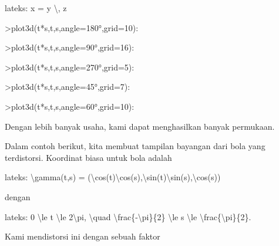 \documentclass[a4paper,10pt]{article}
\begin{document}
\begin{eulernotebook}
\begin{eulercomment}
\begin{eulercomment}
\begin{eulercomment}
lateks: x = y \textbackslash{}, z
\end{eulercomment}
\begin{eulerprompt}
>plot3d(t*s,t,s,angle=180°,grid=10):
\end{eulerprompt}
\begin{eulerprompt}
>plot3d(t*s,t,s,angle=90°,grid=16):
\end{eulerprompt}
\begin{eulerprompt}
>plot3d(t*s,t,s,angle=270°,grid=5):
\end{eulerprompt}
\begin{eulerprompt}
>plot3d(t*s,t,s,angle=45°,grid=7):
\end{eulerprompt}
\begin{eulerprompt}
>plot3d(t*s,t,s,angle=60°,grid=10):
\end{eulerprompt}
\begin{eulercomment}
Dengan lebih banyak usaha, kami dapat menghasilkan banyak permukaan.

Dalam contoh berikut, kita membuat tampilan bayangan dari bola yang
terdistorsi. Koordinat biasa untuk bola adalah

lateks: \textbackslash{}gamma(t,s) = (\textbackslash{}cos(t)\textbackslash{}cos(s),\textbackslash{}sin(t)\textbackslash{}sin(s),\textbackslash{}cos(s))

dengan

lateks: 0 \textbackslash{}le t \textbackslash{}le 2\textbackslash{}pi, \textbackslash{}quad \textbackslash{}frac\{-\textbackslash{}pi\}\{2\} \textbackslash{}le s \textbackslash{}le
\textbackslash{}frac\{\textbackslash{}pi\}\{2\}.

Kami mendistorsi ini dengan sebuah faktor


\end{eulercomment}
\end{eulercomment}
\end{eulercomment}
\end{eulernotebook}
\end{document}
